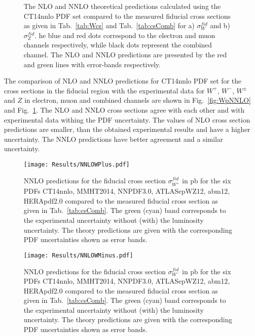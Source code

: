 \begin{figure}[!tbp]
\begin{minipage}[h]{0.45\linewidth}
\end{minipage}
\hfill
\begin{minipage}[h]{0.45\linewidth}
\end{minipage}
\caption{The NLO and NNLO theoretical predictions calculated using the CT14nnlo PDF set compared to the measured fiducial cross sections as given in Tab.~\ref{tab:Wcs} and Tab.~\ref{tab:csComb} for a) $\sigma^{fid}_W$ and b) $\sigma^{fid}_Z$. he blue and red dots correspond to the electron and muon channels respectively, while black dots  represent the combined channel. The NLO and NNLO predictions are presented by the red and green lines with error-bands respectively.}
\label{fig:Z}
\end{figure}

The comparison of NLO and NNLO predictions for CT14nnlo\cite{CT14} PDF set for the cross sections in the fiducial region with the experimental data for $W^{+}$, $W^{-}$, $W^{\pm}$  and $Z$ in electron, muon and combined channels are shown in Fig.~\ref{fig:WpNNLO} and Fig.~\ref{fig:Z}. The NLO and NNLO cross sections agree with each other and with experimental data withing the PDF uncertainty. The values of NLO cross section predictions are smaller, than the obtained experimental results and have a higher uncertainty. The NNLO predictions have better agreement and a similar uncertainty.

\begin{figure}[!tbp]
\begin{center}
\texttt{[image: Results/NNLOWPlus.pdf]}
\end{center}
\caption{ NNLO predictions for the fiducial cross section $\sigma^{fid}_{W^{+}}$ in pb for the six PDFs CT14nnlo, MMHT2014, NNPDF3.0, ATLASepWZ12, abm12, HERApdf2.0 compared to the measured fiducial cross section as given in Tab.~\ref{tab:csComb}. The green (cyan) band corresponds to the experimental uncertainty without (with) the luminosity uncertainty. The theory predictions are given with the corresponding PDF uncertainties shown as error bands. }
\label{fig:NNLODifPDFWP}
\end{figure}

\begin{figure}[!tbp]
\begin{center}
\texttt{[image: Results/NNLOWMinus.pdf]}
\end{center}
\caption{NNLO predictions for the fiducial cross section $\sigma^{fid}_{W^{-}}$ in pb for the six PDFs CT14nnlo, MMHT2014, NNPDF3.0, ATLASepWZ12, abm12, HERApdf2.0 compared to the measured fiducial cross section as given in Tab.~\ref{tab:csComb}. The green (cyan) band corresponds to the experimental uncertainty without (with) the luminosity uncertainty. The theory predictions are given with the corresponding PDF uncertainties shown as error bands.}
\label{fig:NNLODifPDFWm}
\end{figure}

